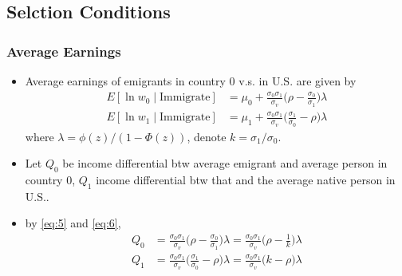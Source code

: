 \documentclass[10pt]{beamer}
\begin{document}
\subsection{Selction Conditions}
\begin{frame}[c]\frametitle{Average Earnings}
\begin{itemize}
\item Average earnings of emigrants in country 0 v.s. in U.S. are given by
\begin{align}
    E[\ln w_{0} \mid \text{Immigrate}] &= \mu_{0} + \frac{\sigma_{0}\sigma_{1}}{\sigma_{v}}\big(\rho - \frac{\sigma_{0}}{\sigma_{1}}\big) \lambda \label{eq:5}\\
    E[\ln w_{1} \mid \text{Immigrate}] &= \mu_{1} + \frac{\sigma_{0}\sigma_{1}}{\sigma_{v}}\big(\frac{\sigma_{1}}{\sigma_{0}} - \rho \big) \lambda  \label{eq:6}
\end{align}
where $\lambda = \phi(z)/(1-\Phi(z))$, denote $k = \sigma_{1}/\sigma_{0}$.
\item Let $Q_{0}$ be income differential btw average emigrant and average person in country 0, $Q_{1}$ income differential btw that and the average native person in U.S..
\item by \eqref{eq:5} and \eqref{eq:6},
\begin{align*}
    Q_{0} &=  \frac{\sigma_{0}\sigma_{1}}{\sigma_{v}}\big(\rho - \frac{\sigma_{0}}{\sigma_{1}}\big) \lambda = \frac{\sigma_{0}\sigma_{1}}{\sigma_{v}}\big(\rho - \frac{1}{k}\big) \lambda \\
    Q_{1} &=   \frac{\sigma_{0}\sigma_{1}}{\sigma_{v}}\big(\frac{\sigma_{1}}{\sigma_{0}} - \rho \big) \lambda =  \frac{\sigma_{0}\sigma_{1}}{\sigma_{v}}\big(k - \rho \big) \lambda
\end{align*}

\end{itemize}
\end{frame}
\end{document}
